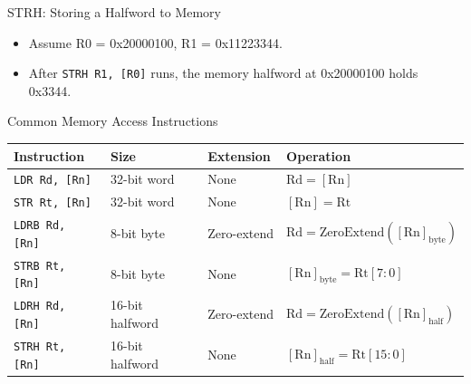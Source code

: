 \documentclass[9pt,aspectratio=169,xcolor=table]{beamer}
\begin{document}
{\begin{frame}[fragile]{STRH: Storing a Halfword to Memory}
{%
	}
	\begin{itemize}
		\item Assume R0 = 0x20000100, R1 = 0x11223344.
		\item After \texttt{STRH R1, [R0]} runs, the \alert{memory halfword} at 0x20000100 holds 0x3344.
	\end{itemize}
\end{frame}
}

\begin{frame}{Common Memory Access Instructions}
    \begin{center}
    {\normalsize
    \striped
    \begin{tabular}{@{}l l l l@{}}
        \toprule
        \textbf{Instruction} & \textbf{Size} & \textbf{Extension} & \textbf{Operation} \\
        \midrule
        \texttt{LDR Rd, [Rn]}   & 32-bit word     & None        & $\text{Rd}=[\text{Rn}]$ \\
        \texttt{STR Rt, [Rn]}   & 32-bit word     & None        & $[\text{Rn}]=\text{Rt}$ \\
        \texttt{LDRB Rd, [Rn]}  & 8-bit byte      & Zero-extend & $\text{Rd}=\text{ZeroExtend}([\text{Rn}]_{\text{byte}})$ \\
        \texttt{STRB Rt, [Rn]}  & 8-bit byte      & None        & $[\text{Rn}]_{\text{byte}}=\text{Rt}[7{:}0]$ \\
        \texttt{LDRH Rd, [Rn]}  & 16-bit halfword & Zero-extend & $\text{Rd}=\text{ZeroExtend}([\text{Rn}]_{\text{half}})$ \\
        \texttt{STRH Rt, [Rn]}  & 16-bit halfword & None        & $[\text{Rn}]_{\text{half}}=\text{Rt}[15{:}0]$ \\
        \bottomrule
    \end{tabular}}
    \end{center}
\end{frame}
\end{document}
